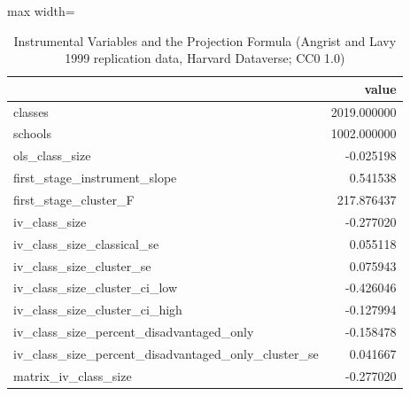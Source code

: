\begin{table}[htbp]
\centering
\caption{Instrumental Variables and the Projection Formula (Angrist and Lavy 1999 replication data, Harvard Dataverse; CC0 1.0)}
\begingroup
\small
\setlength{\tabcolsep}{6pt}
\renewcommand{\arraystretch}{1.12}
\begin{adjustbox}{max width=\linewidth}
\begin{tabular}{@{}lr@{}}
\toprule
 & value \\
\midrule
classes & 2019.000000 \\
schools & 1002.000000 \\
ols\_class\_size & -0.025198 \\
first\_stage\_instrument\_slope & 0.541538 \\
first\_stage\_cluster\_F & 217.876437 \\
iv\_class\_size & -0.277020 \\
iv\_class\_size\_classical\_se & 0.055118 \\
iv\_class\_size\_cluster\_se & 0.075943 \\
iv\_class\_size\_cluster\_ci\_low & -0.426046 \\
iv\_class\_size\_cluster\_ci\_high & -0.127994 \\
iv\_class\_size\_percent\_disadvantaged\_only & -0.158478 \\
iv\_class\_size\_percent\_disadvantaged\_only\_cluster\_se & 0.041667 \\
matrix\_iv\_class\_size & -0.277020 \\
\bottomrule
\end{tabular}
\end{adjustbox}
\endgroup
\end{table}